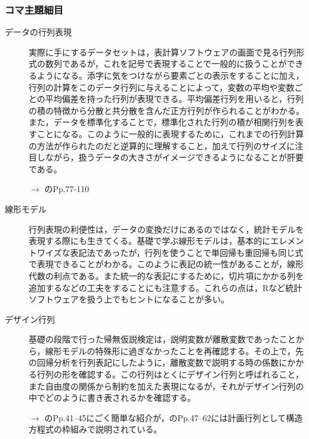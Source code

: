 \subsubsection{コマ主題細目}
\begin{description}
	\item[データの行列表現] 実際に手にするデータセットは，表計算ソフトウェアの画面で見る行列形式の数列であるが，これを記号で表現することで一般的に扱うことができるようになる。添字に気をつけながら要素ごとの表示をすることに加え，行列の計算をこのデータ行列に与えることによって，変数の平均や変数ごとの平均偏差を持った行列が表現できる。平均偏差行列を用いると，行列の積の特徴から分散と共分散を含んだ正方行列が作られることがわかる。また，データを標準化することで，標準化された行列の積が相関行列を表すことになる。このように一般的に表現するために，これまでの行列計算の方法が作られたのだと逆算的に理解すること，加えて行列のサイズに注目しながら，扱うデータの大きさがイメージできるようになることが肝要である。

	      \begin{flushright}
		      $\to$ \citet{Okada200804}のPp.77-110
	      \end{flushright}

	\item[線形モデル] 行列表現の利便性は，データの変換だけにあるのではなく，統計モデルを表現する際にも生きてくる。基礎で学ぶ線形モデルは，基本的にエレメントワイズな表記法であったが，行列を使うことで単回帰も重回帰も同じ式で表現できることがわかる。このように表記の統一性があることが，線形代数の利点である。また統一的な表記にするために，切片項にかかる列を追加するなどの工夫をすることにも注意する。これらの点は，Rなど統計ソフトウェアを扱う上でもヒントになることが多い。

	\item[デザイン行列] 基礎の段階で行った帰無仮説検定は，説明変数が離散変数であったことから，線形モデルの特殊形に過ぎなかったことを再確認する。その上で，先の回帰分析を行列表記にしたように，離散変数で説明する時の係数にかかる行列の形を確認する。この行列はとくにデザイン行列と呼ばれること，また自由度の関係から制約を加えた表現になるが，それがデザイン行列の中でどのように書き表されるかを確認する。

	      \begin{flushright}
		      $\to$ \citet{Annette_J_Dobson2008-09-08}のPp.41--45にごく簡単な紹介が，\citet{Toyoda20000401}のPp.47--62には計画行列として構造方程式の枠組みで説明されている。
	      \end{flushright}


\end{description}
